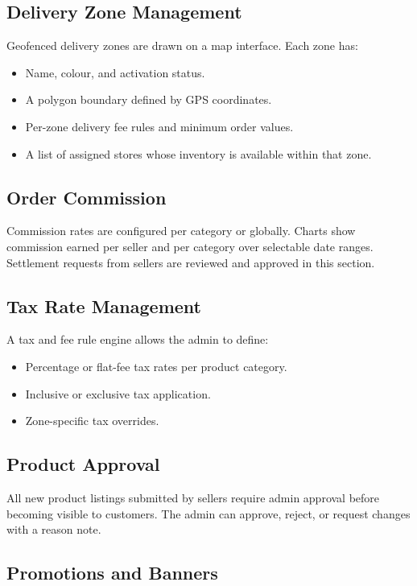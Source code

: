 \documentclass[12pt, a4paper, oneside]{report}
\begin{document}
\subsection{Delivery Zone Management}

Geofenced delivery zones are drawn on a map interface. Each zone has:
\begin{itemize}
  \item Name, colour, and activation status.
  \item A polygon boundary defined by GPS coordinates.
  \item Per-zone delivery fee rules and minimum order values.
  \item A list of assigned stores whose inventory is available within that zone.
\end{itemize}

\subsection{Order Commission}

Commission rates are configured per category or globally. Charts show commission
earned per seller and per category over selectable date ranges. Settlement
requests from sellers are reviewed and approved in this section.

\subsection{Tax Rate Management}

A tax and fee rule engine allows the admin to define:
\begin{itemize}
  \item Percentage or flat-fee tax rates per product category.
  \item Inclusive or exclusive tax application.
  \item Zone-specific tax overrides.
\end{itemize}

\subsection{Product Approval}

All new product listings submitted by sellers require admin approval before
becoming visible to customers. The admin can approve, reject, or request
changes with a reason note.

\subsection{Promotions and Banners}
\end{document}
